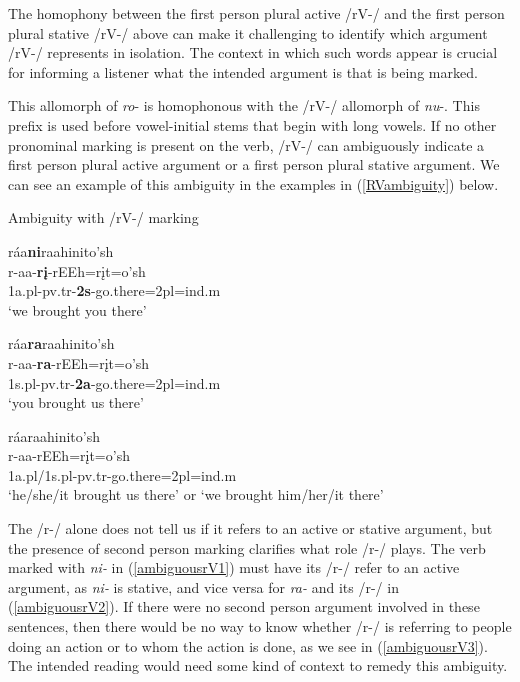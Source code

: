 The homophony between the first person plural active /rV-/ and the first person plural stative /rV-/ above can make it challenging to identify which argument /rV-/ represents in isolation. The context in which such words appear is crucial for informing a listener what the intended argument is that is being marked.


This allomorph of \textit{ro}- is homophonous with the /rV-/ allomorph of \textit{nu}-. This prefix is used before vowel-initial stems that begin with long vowels. If no other pronominal marking is present on the verb, /rV-/ can ambiguously indicate a first person plural active argument or a first person plural stative argument. We can see an example of this ambiguity in the examples in (\ref{RVambiguity}) below.

\begin{exe}

\item\label{RVambiguity} Ambiguity with /rV-/ marking

	\begin{xlist}
	
	\item\label{ambiguousrV1} \glll ráa\textbf{ni}raahinito'sh\\
	r-aa-\textbf{rį}-rEEh=rįt=o'sh\\
	1a.pl-pv.tr-\textbf{2s}-\textnormal{go.there}=2pl=ind.m\\
	\glt `we brought you there'
	
	\item\label{ambiguousrV2} \glll ráa\textbf{ra}raahinito'sh\\
	r-aa-\textbf{ra}-rEEh=rįt=o'sh\\
	1s.pl-pv.tr-\textbf{2a}-\textnormal{go.there}=2pl=ind.m\\
	\glt `you brought us there'
	
	\item\label{ambiguousrV3} \glll ráaraahinito'sh\\
	r-aa-rEEh=rįt=o'sh\\
	1a.pl/1s.pl-pv.tr-\textnormal{go.there}=2pl=ind.m\\
	\glt `he/she/it brought us there' or `we brought him/her/it there'
	
	\end{xlist}

\end{exe}

The /r-/ alone does not tell us if it refers to an active or stative argument, but the presence of second person marking clarifies what role /r-/ plays. The verb marked with \textit{ni-} in (\ref{ambiguousrV1}) must have its /r-/ refer to an active argument, as \textit{ni-} is stative, and vice versa for \textit{ra-} and its /r-/ in (\ref{ambiguousrV2}). If there were no second person argument involved in these sentences, then there would be no way to know whether /r-/ is referring to people doing an action or to whom the action is done, as we see in (\ref{ambiguousrV3}). The intended reading would need some kind of context to remedy this ambiguity.

